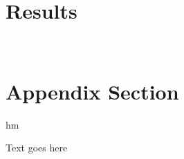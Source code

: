 \documentclass[12pt]{article}
\begin{document}

\section{Results}\label{sec:results}





\newpage~\appendix

\section{Appendix Section}

hm

Text goes here
\end{document}
